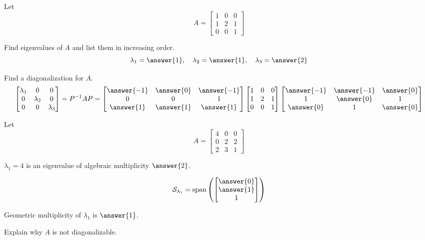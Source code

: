 \documentclass{ximera}
\begin{document}
\begin{problem}\label{prob:diag3by3}
    Let $$A=\begin{bmatrix}
1 & 0 & 0 \\
1 & 2 & 1 \\
0 & 0 & 1
\end{bmatrix}$$

\begin{question}
    Find eigenvalues of $A$ and list them in increasing order.
    $$\lambda_1=\answer{1},\quad\lambda_2=\answer{1},\quad\lambda_3=\answer{2}$$
\end{question}

\begin{question}
    Find a diagonalization for $A$.
    $$\begin{bmatrix}\lambda_1 & 0 & 0\\0 & \lambda_2 & 0\\0 & 0 & \lambda_3\end{bmatrix}=P^{-1}AP=\begin{bmatrix}\answer{-1} & \answer{0} &\answer{-1}\\0&0&1\\\answer{1} & \answer{1}&\answer{1}\end{bmatrix}\begin{bmatrix}
1 & 0 & 0 \\
1 & 2 & 1 \\
0 & 0 & 1
\end{bmatrix}\begin{bmatrix}\answer{-1} & \answer{-1} & \answer{0}\\1 & \answer{0} & 1\\\answer{0} &1 & \answer{0}\end{bmatrix}$$
\end{question}
\end{problem}

\begin{problem}\label{prob:notDiagonalizable3by3}
    Let $$A=\begin{bmatrix}
4 & 0 & 0 \\
0 & 2 & 2 \\
2 & 3 & 1
\end{bmatrix}$$


    $\lambda_1=4$ is an eigenvalue of algebraic multiplicity $\answer{2}$.

    $$\mathcal{S}_{\lambda_1}=\text{span}\left(\begin{bmatrix}\answer{0}\\\answer{1}\\1\end{bmatrix}\right)$$

    Geometric multiplicity of $\lambda_1$ is $\answer{1}$.

    Explain why $A$ is not diagonalizable.

\end{problem}
\end{document}
